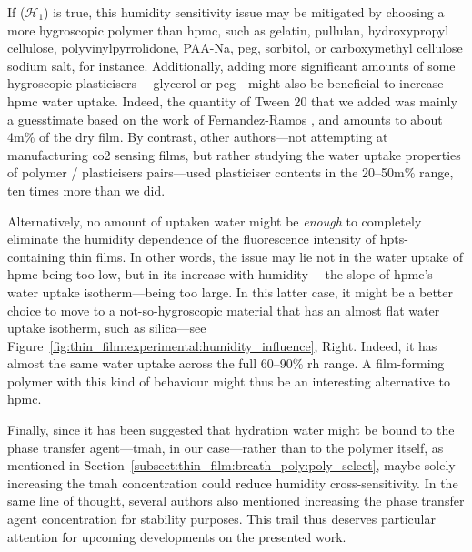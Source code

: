 If ($\mathcal{H}_1$) is true, this humidity sensitivity issue may be mitigated by choosing a more hygroscopic polymer than \gls{hpmc}, such as gelatin, pullulan\cite{yang2020capsule}, hydroxypropyl cellulose\cite{patel2022_part2}, poly\-vinyl\-pyrrolidone\cite{patel2023_part3}, PAA-Na\cite{thijs2007}, \gls{peg}, sorbitol, or carboxymethyl cellulose sodium salt\cite{callahan1982}, for instance. Additionally, adding more significant amounts of some hygroscopic plasticisers---\eg{} glycerol or \gls{peg}---might also be beneficial to increase \gls{hpmc} water uptake\cite{malik2022}. Indeed, the quantity of Tween 20 that we added was mainly a guesstimate based on the work of Fernandez-Ramos \etal{}\cite{fernandezramos2018}, and amounts to about 4m\% of the dry film. By contrast, other authors---not attempting at manufacturing \gls{co2} sensing films, but rather studying the water uptake properties of polymer / plasticisers pairs---used plasticiser contents in the 20--50m\% range\cite{suyatma2005, zeppa2009, khwaldia2013, malik2022}, \ie{} ten times more than we did.

Alternatively, no amount of uptaken water might be \emph{enough} to completely eliminate the humidity dependence of the fluorescence intensity of \gls{hpts}-containing thin films. In other words, the issue may lie not in the water uptake of \gls{hpmc} being too low, but in its increase with humidity---\ie{} the slope of \gls{hpmc}'s water uptake isotherm---being too large. In this latter case, it might be a better choice to move to a not-so-hygroscopic material that has an almost flat water uptake isotherm, such as silica---see Figure~\ref{fig:thin_film:experimental:humidity_influence}, Right. Indeed, it has almost the same water uptake across the full 60--90\% \gls{rh} range. A film-forming polymer with this kind of behaviour might thus be an interesting alternative to \gls{hpmc}.

Finally, since it has been suggested that hydration water might be bound to the phase transfer agent---\gls{tmah}, in our case---rather than to the polymer itself, as mentioned in Section~\ref{subsect:thin_film:breath_poly:poly_select}, maybe solely increasing the \gls{tmah} concentration could reduce humidity cross-sensitivity. In the same line of thought, several authors also mentioned increasing the phase transfer agent concentration for stability purposes\cite{neurauter1999, ge2003, cajlakovic2006, aguayolopez2014}. This \mfrin{}trail thus deserves particular attention for upcoming developments on the presented work.

